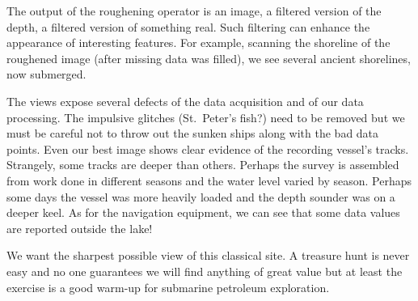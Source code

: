 
\par
The output of the roughening operator is an image,
a filtered version of the depth,
a filtered version of something real.
Such filtering can enhance the appearance of interesting features.
For example,
scanning the shoreline of the roughened image
(after missing data was filled),
we see several ancient shorelines, now submerged.
\par
{}
\par
The views expose several defects
of the data acquisition and of our data processing.
The impulsive glitches (St.~Peter's fish?)
need to be removed but we must be careful not to throw
out the sunken ships along with the bad data points.
Even our best image shows clear evidence of the recording vessel's tracks.
Strangely, some tracks are deeper than others.
Perhaps the survey is assembled from work done in different seasons
and the water level varied by season.
Perhaps some days the vessel was more heavily loaded
and the depth sounder was on a deeper keel.
As for the navigation equipment,
we can see that some data values are reported outside the lake!
\par
\par
We want the sharpest possible view
of this classical site.
A treasure hunt is never easy
and no one guarantees we will
find anything of great value
but at least the exercise is a good warm-up
for submarine petroleum exploration.


